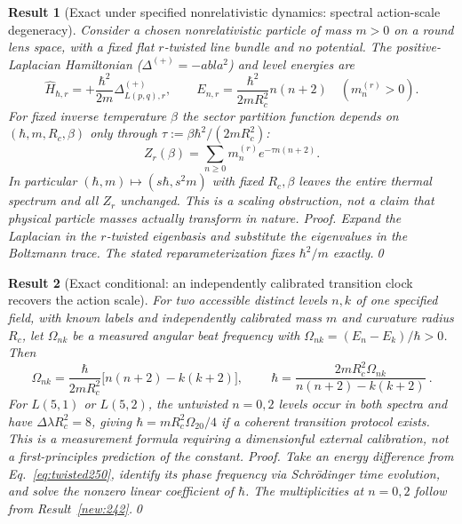 \documentclass[aps,prd,onecolumn,notitlepage,groupedaddress,11pt]{revtex4-2}
\newtheorem{result}{Result}
\begin{document}
\begin{result}[\textsf{Exact under specified nonrelativistic dynamics}: spectral action-scale degeneracy]\label{new:250}
Consider a \emph{chosen} nonrelativistic particle of mass $m>0$ on a round lens space, with a fixed flat $r$-twisted line bundle and no potential. The positive-Laplacian Hamiltonian ($\Delta^{(+)}=-
abla^2$) and level energies are
\begin{equation}\label{eq:twisted250}
 \widehat H_{\hbar,r}=+\frac{\hbar^2}{2m}\Delta^{(+)}_{L(p,q),r},\qquad
 E_{n,r}=\frac{\hbar^2}{2mR_c^2}n(n+2)\quad(m_n^{(r)}>0).
\end{equation}
For fixed inverse temperature $\beta$ the sector partition function depends on $(\hbar,m,R_c,\beta)$ only through $\tau:=\beta\hbar^2/(2mR_c^2)$:
\begin{equation}\label{eq:twisted250b}
 Z_r(\beta)=\sum_{n\ge0}m_n^{(r)}e^{-\tau n(n+2)}.
\end{equation}
In particular $(\hbar,m)\mapsto(s\hbar,s^2m)$ with fixed $R_c,\beta$ leaves the entire thermal spectrum and all $Z_r$ unchanged. This is a scaling obstruction, not a claim that physical particle masses actually transform in nature.
\textit{Proof.} Expand the Laplacian in the $r$-twisted eigenbasis and substitute the eigenvalues in the Boltzmann trace. The stated reparameterization fixes $\hbar^2/m$ exactly.\qed
\end{result}

\begin{result}[\textsf{Exact conditional}: an independently calibrated transition clock recovers the action scale]\label{new:251}
For two \emph{accessible} distinct levels $n,k$ of one specified field, with known labels and independently calibrated mass $m$ and curvature radius $R_c$, let $\Omega_{nk}$ be a measured angular beat frequency with $\Omega_{nk}=(E_n-E_k)/\hbar>0$. Then
\begin{equation}\label{eq:twisted251}
 \Omega_{nk}=\frac{\hbar}{2mR_c^2}\big[n(n+2)-k(k+2)\big],\qquad
 \boxed{\ \hbar=\frac{2mR_c^2\Omega_{nk}}{n(n+2)-k(k+2)}\ }.
\end{equation}
For $L(5,1)$ or $L(5,2)$, the untwisted $n=0,2$ levels occur in both spectra and have $\Delta\lambda R_c^2=8$, giving $\hbar=mR_c^2\Omega_{20}/4$ \emph{if a coherent transition protocol exists}. This is a measurement formula requiring a dimensionful external calibration, not a first-principles prediction of the constant.
\textit{Proof.} Take an energy difference from Eq.~\eqref{eq:twisted250}, identify its phase frequency via Schr\"odinger time evolution, and solve the nonzero linear coefficient of $\hbar$. The multiplicities at $n=0,2$ follow from Result~\ref{new:242}.\qed
\end{result}
\end{document}

